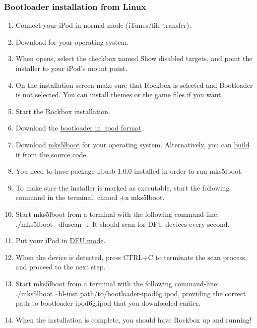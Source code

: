 \subsubsection{Bootloader installation from Linux}

\begin{enumerate}

\item Connect your iPod in normal mode (iTunes/file transfer).
\item Download  for your operating system.
\item When  opens, select the checkbox named Show disabled targets, and point the installer to your iPod's mount point.
\item On the installation screen make sure that Rockbox is selected and Bootloader is not selected. You can install themes or the game files if you want.
\item Start the Rockbox installation.
\item Download the \href{https://download.rockbox.org/bootloader/ipod/bootloader-ipod6g.ipod}{bootloader in .ipod format}.
\item Download \href{https://files.freemyipod.org/~user890104/bootloader-ipodclassic-v1_0}{mks5lboot} for your operating system. Alternatively, you can \href{https://files.freemyipod.org/~user890104/bootloader-ipodclassic.html#build_mks5lboot}{build it} from the source code.
\item You need to have package libusb-1.0.0 installed in order to run mks5lboot.
\item To make sure the installer is marked as executable, start the following command in the terminal: chmod +x mks5lboot.
\item Start mks5lboot from a terminal with the following command-line: ./mks5lboot --dfuscan -l. It should scan for DFU devices every second.
\item Put your iPod in \href{https://files.freemyipod.org/~user890104/bootloader-ipodclassic.html#dfu}{DFU mode}.
\item When the device is detected, press CTRL+C to terminate the scan process, and proceed to the next step.
\item Start mks5lboot from a terminal with the following command-line: ./mks5lboot --bl-inst path/to/bootloader-ipod6g.ipod, providing the correct path to bootloader-ipod6g.ipod that you downloaded earlier.
\item When the installation is complete, you should have Rockbox up and running!

\end{enumerate}
